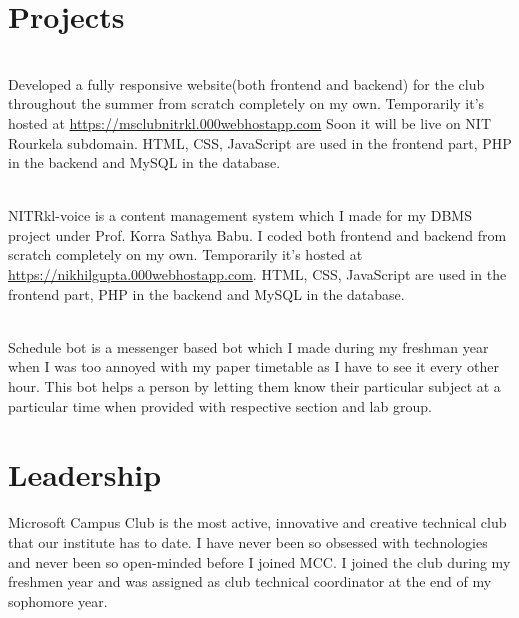\documentclass[]{deedy-resume-openfont}
\begin{document}
\begin{minipage}[t]{0.66\textwidth} 


\section{Projects}

\\
Developed a fully responsive website(both frontend and backend) for the club throughout the summer from scratch completely on my own. Temporarily it's hosted at \url{https://msclubnitrkl.000webhostapp.com} Soon it will be live on NIT Rourkela subdomain. HTML, CSS, JavaScript are used in the frontend part, PHP in the backend and MySQL in the database.
\sectionsep

\\
NITRkl-voice is a content management system which I made for my DBMS project under Prof. Korra Sathya Babu. I coded both frontend and backend from scratch completely on my own. Temporarily it's hosted at \url{https://nikhilgupta.000webhostapp.com}. HTML, CSS, JavaScript are used in the frontend part, PHP in the backend and MySQL in the database.
\sectionsep

\\
Schedule bot is a messenger based bot which I made during my freshman year when I was too annoyed with my paper timetable as I have to see it every other hour. This bot helps a person by letting them know their particular subject at a particular time when provided with respective section and lab group.
\sectionsep




\section{Leadership}
Microsoft Campus Club is the most active, innovative and creative technical club that our institute has to date. I have never been so obsessed with technologies and never been so open-minded before I joined MCC. I joined the club during my freshmen year and was assigned as club technical coordinator at the end of my sophomore year.
\sectionsep


\end{minipage}
\end{document}
